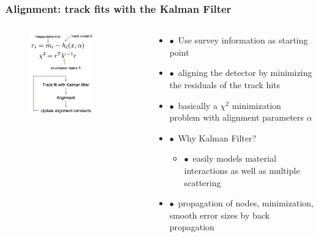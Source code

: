 \documentclass[aspectratio=1610, 12pt, xcolor=dvipsnames]{beamer}
\begin{document}
\begin{frame}\frametitle{Alignment: track fits with the Kalman Filter}
  \begin{columns}
    \begin{column}[c]{0.4\textwidth}
      \begin{figure}
        \centering
        \includegraphics[width=0.72\textwidth]{logos/kalman.png}
      \end{figure}
    \end{column}
    \begin{column}[c]{0.55\textwidth}
      \begin{itemize}
        \item $\bullet$\, Use survey information as starting point
        \item $\bullet$\, aligning the detector by minimizing the residuals of the track hits
        \item $\bullet$\, basically a $\chi^2$ minimization problem with alignment parameters $\alpha$
        \item $\bullet$\, Why Kalman Filter?
        \begin{itemize}
          \item $\bullet$\, easily models material interactions as well as multiple scattering
        \end{itemize}
        \item $\bullet$\, propagation of nodes, minimization, smooth error sizes by back propagation
      \end{itemize}
    \end{column}
  \end{columns}
\end{frame}
\end{document}
